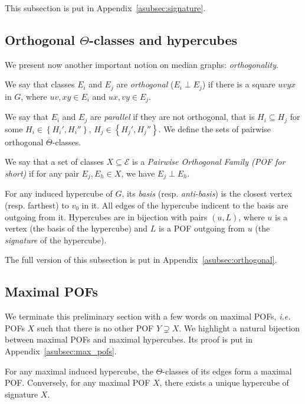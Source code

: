 \documentclass[a4paper,UKenglish,numberwithinsect,cleveref, autoref]{lipics-v2021}
\newcommand{\set}[1]{\left\{ #1 \right\}}
\begin{document}
This subsection is put in Appendix~\ref{asubsec:signature}.

\subsection{Orthogonal $\Theta$-classes and hypercubes}

We present now another important notion on median graphs: \textit{orthogonality}.

\begin{definition}
We say that classes $E_i$ and $E_j$ are {\em orthogonal} ($E_i \perp E_j$) if there is a square $uvyx$ in $G$, where $uv,xy \in E_i$ and $ux,vy \in E_j$.
\end{definition}

We say that $E_i$ and $E_j$ are \textit{parallel} if they are not orthogonal, that is $H_i \subseteq H_j$ for some $H_i \in \set{H_i',H_i''}$, $H_j \in \set{H_j',H_j''}$. 
We define the sets of pairwise orthogonal $\Theta$-classes.

\begin{definition}
We say that a set of classes $X \subseteq \mathcal{E}$ is a {\em Pairwise Orthogonal Family (POF for short)} if for any pair $E_j,E_h \in X$, we have $E_j \perp E_h$.
\end{definition}

For any induced hypercube of $G$, its \textit{basis} (resp. \textit{anti-basis}) is the closest vertex (resp. farthest) to $v_0$ in it. All edges of the hypercube indicent to the basis are outgoing from it. Hypercubes are in bijection with pairs $(u,L)$, where $u$ is a vertex (the basis of the hypercube) and $L$ is a POF outgoing from $u$ (the \textit{signature} of the hypercube).

The full version of this subsection is put in Appendix~\ref{asubsec:orthogonal}.

\subsection{Maximal POFs} \label{subsec:max_pofs}

We terminate this preliminary section with a few words on maximal POFs, {\em i.e.} POFs $X$ such that there is no other POF $Y \supsetneq X$. We highlight a natural bijection between maximal POFs and maximal hypercubes. Its proof is put in Appendix~\ref{asubsec:max_pofs}.

\begin{theorem}[\ref{th:maximal_pofs}]
For any maximal induced hypercube, the $\Theta$-classes of its edges form a maximal POF.
Conversely, for any maximal POF $X$, there exists a unique hypercube of signature $X$. 
\label{th:maximal_pofs_teaser}
\end{theorem}
\end{document}
